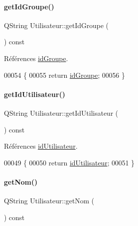 \paragraph{\texorpdfstring{get\+Id\+Groupe()}{getIdGroupe()}}
{\footnotesize\ttfamily Q\+String Utilisateur\+::get\+Id\+Groupe (\begin{DoxyParamCaption}{ }\end{DoxyParamCaption}) const}



Références \hyperlink{class_utilisateur_a13c3425772da1d5501e6fe4a2f2b8194}{id\+Groupe}.


\begin{DoxyCode}
00054 \{
00055     \textcolor{keywordflow}{return} \hyperlink{class_utilisateur_a13c3425772da1d5501e6fe4a2f2b8194}{idGroupe};
00056 \}
\end{DoxyCode}
\mbox{\label{class_utilisateur_aae4df3c09e4bd421407ea526876a2eaf}} 
\paragraph{\texorpdfstring{get\+Id\+Utilisateur()}{getIdUtilisateur()}}
{\footnotesize\ttfamily Q\+String Utilisateur\+::get\+Id\+Utilisateur (\begin{DoxyParamCaption}{ }\end{DoxyParamCaption}) const}



Références \hyperlink{class_utilisateur_ae1763e7a52c82c63506bc4160cdabb20}{id\+Utilisateur}.


\begin{DoxyCode}
00049 \{
00050     \textcolor{keywordflow}{return} \hyperlink{class_utilisateur_ae1763e7a52c82c63506bc4160cdabb20}{idUtilisateur};
00051 \}
\end{DoxyCode}
\mbox{\label{class_utilisateur_adfffec2519ba338497de55b61e7bc420}} 
\paragraph{\texorpdfstring{get\+Nom()}{getNom()}}
{\footnotesize\ttfamily Q\+String Utilisateur\+::get\+Nom (\begin{DoxyParamCaption}{ }\end{DoxyParamCaption}) const}



